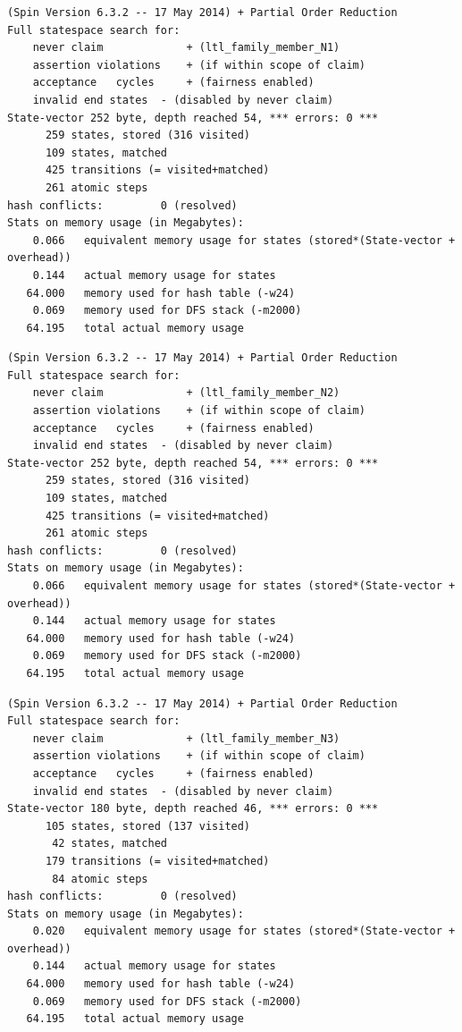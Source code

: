 \singlespacing
\begin{lstlisting}[caption=Family Member\#1 Plan Verification,
  label=Family1Result]
(Spin Version 6.3.2 -- 17 May 2014) + Partial Order Reduction
Full statespace search for:
	never claim         	+ (ltl_family_member_N1)
	assertion violations	+ (if within scope of claim)
	acceptance   cycles 	+ (fairness enabled)
	invalid end states	- (disabled by never claim)
State-vector 252 byte, depth reached 54, *** errors: 0 ***
      259 states, stored (316 visited)
      109 states, matched
      425 transitions (= visited+matched)
      261 atomic steps
hash conflicts:         0 (resolved)
Stats on memory usage (in Megabytes):
    0.066	equivalent memory usage for states (stored*(State-vector + overhead))
    0.144	actual memory usage for states
   64.000	memory used for hash table (-w24)
    0.069	memory used for DFS stack (-m2000)
   64.195	total actual memory usage
\end{lstlisting}
\doublespacing

\singlespacing
\begin{lstlisting}[caption=Family Member\#2 Plan Verification,
  label=Family2Result]
(Spin Version 6.3.2 -- 17 May 2014) + Partial Order Reduction
Full statespace search for:
	never claim         	+ (ltl_family_member_N2)
	assertion violations	+ (if within scope of claim)
	acceptance   cycles 	+ (fairness enabled)
	invalid end states	- (disabled by never claim)
State-vector 252 byte, depth reached 54, *** errors: 0 ***
      259 states, stored (316 visited)
      109 states, matched
      425 transitions (= visited+matched)
      261 atomic steps
hash conflicts:         0 (resolved)
Stats on memory usage (in Megabytes):
    0.066	equivalent memory usage for states (stored*(State-vector + overhead))
    0.144	actual memory usage for states
   64.000	memory used for hash table (-w24)
    0.069	memory used for DFS stack (-m2000)
   64.195	total actual memory usage
\end{lstlisting}
\doublespacing

\singlespacing
\begin{lstlisting}[caption=Family Member\#3 Plan Verification,
  label=Family3Result]
(Spin Version 6.3.2 -- 17 May 2014) + Partial Order Reduction
Full statespace search for:
	never claim         	+ (ltl_family_member_N3)
	assertion violations	+ (if within scope of claim)
	acceptance   cycles 	+ (fairness enabled)
	invalid end states	- (disabled by never claim)
State-vector 180 byte, depth reached 46, *** errors: 0 ***
      105 states, stored (137 visited)
       42 states, matched
      179 transitions (= visited+matched)
       84 atomic steps
hash conflicts:         0 (resolved)
Stats on memory usage (in Megabytes):
    0.020	equivalent memory usage for states (stored*(State-vector + overhead))
    0.144	actual memory usage for states
   64.000	memory used for hash table (-w24)
    0.069	memory used for DFS stack (-m2000)
   64.195	total actual memory usage
\end{lstlisting}
\doublespacing

